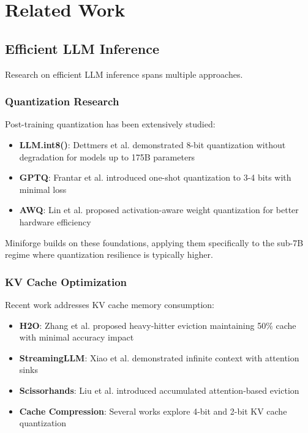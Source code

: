 \section{Related Work}
\label{sec:related_work}

\subsection{Efficient LLM Inference}

Research on efficient LLM inference spans multiple approaches.

\subsubsection{Quantization Research}

Post-training quantization has been extensively studied:

\begin{itemize}
    \item \textbf{LLM.int8()}: Dettmers et al. demonstrated 8-bit quantization without degradation for models up to 175B parameters \cite{dettmers2022llm}
    \item \textbf{GPTQ}: Frantar et al. introduced one-shot quantization to 3-4 bits with minimal loss \cite{frantar2022gptq}
    \item \textbf{AWQ}: Lin et al. proposed activation-aware weight quantization for better hardware efficiency \cite{lin2023awq}
\end{itemize}

Miniforge builds on these foundations, applying them specifically to the sub-7B regime where quantization resilience is typically higher.

\subsubsection{KV Cache Optimization}

Recent work addresses KV cache memory consumption:

\begin{itemize}
    \item \textbf{H2O}: Zhang et al. proposed heavy-hitter eviction maintaining 50\% cache with minimal accuracy impact \cite{zhang2023h2o}
    \item \textbf{StreamingLLM}: Xiao et al. demonstrated infinite context with attention sinks \cite{xiao2023streamingllm}
    \item \textbf{Scissorhands}: Liu et al. introduced accumulated attention-based eviction \cite{liu2023scissorhands}
    \item \textbf{Cache Compression}: Several works explore 4-bit and 2-bit KV cache quantization
\end{itemize}

